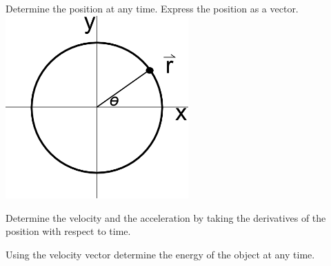 \begin{problem}
\begin{subproblem}
  \item Determine the position at any time. Express the position as
    a vector.
     \\
    \includegraphics[width=7cm]{ink/week12/circularMotion}
    \vfill
  \item Determine the velocity and the acceleration by taking the
    derivatives of the position with respect to time.
    \vfill
  \item Using the velocity vector determine the energy of the object
    at any time.
    \vfill
  \end{subproblem}
\end{problem}

